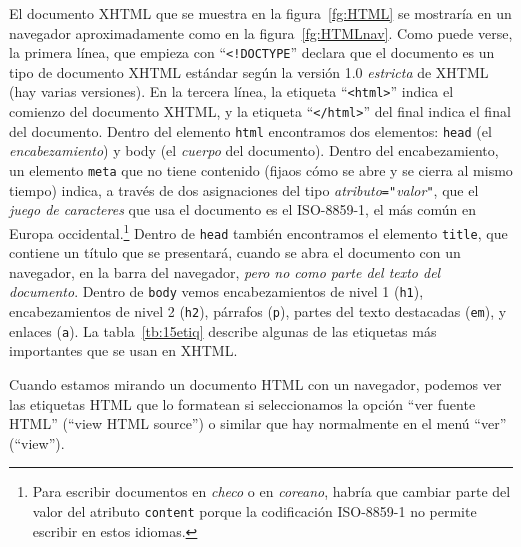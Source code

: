 El documento XHTML que se muestra en la figura~\ref{fg:HTML} se mostraría en un navegador aproximadamente como en la figura~\ref{fg:HTMLnav}. Como puede verse, la primera línea, que empieza con ``\texttt{<!DOCTYPE}'' declara que el documento es un tipo de documento XHTML estándar según la versión 1.0 \emph{estricta} de XHTML (hay varias versiones). En la tercera línea, la etiqueta ``\texttt{<html>}'' indica el comienzo del documento XHTML, y la etiqueta ``\texttt{</html>}'' del final indica el final del documento. Dentro del elemento \texttt{html} encontramos dos elementos: \texttt{head} (el \emph{encabezamiento}) y body \texttt{} (el \emph{cuerpo} del documento). Dentro del encabezamiento, un elemento \texttt{meta} que no tiene contenido (fijaos cómo se abre y se cierra al mismo tiempo) indica, a través de dos asignaciones del tipo \emph{atributo}\texttt{="}\emph{valor}\texttt{"}, que el \emph{juego de caracteres} que usa el documento es el ISO-8859-1, el más común en Europa occidental.\footnote{Para escribir documentos en \emph{checo} o en \emph{coreano}, habría que cambiar parte del valor del atributo \texttt{content} porque la codificación ISO-8859-1 no permite escribir en estos idiomas.} Dentro de \texttt{head} también encontramos el elemento \texttt{title}, que contiene un título que se presentará, cuando se abra el documento con un navegador, en la barra del navegador, \emph{pero no como parte del texto del documento}. Dentro de \texttt{body} vemos encabezamientos de nivel 1 (\texttt{h1}), encabezamientos de nivel 2 (\texttt{h2}), párrafos (\texttt{p}), partes del texto destacadas (\texttt{em}), y enlaces (\texttt{a}). La tabla~\ref{tb:15etiq} describe algunas de las etiquetas más importantes que se usan en XHTML. 

Cuando estamos mirando un documento HTML con un navegador, podemos ver las etiquetas HTML que lo formatean si seleccionamos la opción ``ver fuente HTML'' (``view HTML source'') o similar que hay normalmente en el menú ``ver'' (``view''). 

